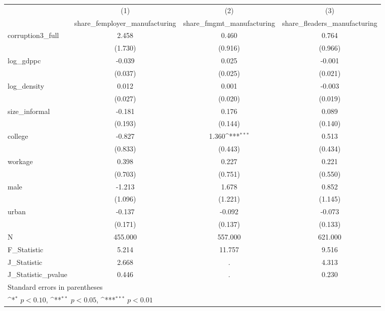 {
\def\sym#1{\ifmmode^{#1}\else\(^{#1}\)\fi}
\begin{tabular}{l*{3}{c}}
\hline\hline
            &\multicolumn{1}{c}{(1)}&\multicolumn{1}{c}{(2)}&\multicolumn{1}{c}{(3)}\\
            &\multicolumn{1}{c}{share\_femployer\_manufacturing}&\multicolumn{1}{c}{share\_fmgmt\_manufacturing}&\multicolumn{1}{c}{share\_fleaders\_manufacturing}\\
\hline
corruption3\_full&       2.458         &       0.460         &       0.764         \\
            &     (1.730)         &     (0.916)         &     (0.966)         \\
[1em]
log\_gdppc   &      -0.039         &       0.025         &      -0.001         \\
            &     (0.037)         &     (0.025)         &     (0.021)         \\
[1em]
log\_density &       0.012         &       0.001         &      -0.003         \\
            &     (0.027)         &     (0.020)         &     (0.019)         \\
[1em]
size\_informal&      -0.181         &       0.176         &       0.089         \\
            &     (0.193)         &     (0.144)         &     (0.140)         \\
[1em]
college     &      -0.827         &       1.360\sym{***}&       0.513         \\
            &     (0.833)         &     (0.443)         &     (0.434)         \\
[1em]
workage     &       0.398         &       0.227         &       0.221         \\
            &     (0.703)         &     (0.751)         &     (0.550)         \\
[1em]
male        &      -1.213         &       1.678         &       0.852         \\
            &     (1.096)         &     (1.221)         &     (1.145)         \\
[1em]
urban       &      -0.137         &      -0.092         &      -0.073         \\
            &     (0.171)         &     (0.137)         &     (0.133)         \\
\hline
N           &     455.000         &     557.000         &     621.000         \\
F\_Statistic &       5.214         &      11.757         &       9.516         \\
J\_Statistic &       2.668         &           .         &       4.313         \\
J\_Statistic\_pvalue&       0.446         &           .         &       0.230         \\
\hline\hline
\multicolumn{4}{l}{\footnotesize Standard errors in parentheses}\\
\multicolumn{4}{l}{\footnotesize \sym{*} \(p<0.10\), \sym{**} \(p<0.05\), \sym{***} \(p<0.01\)}\\
\end{tabular}
}
